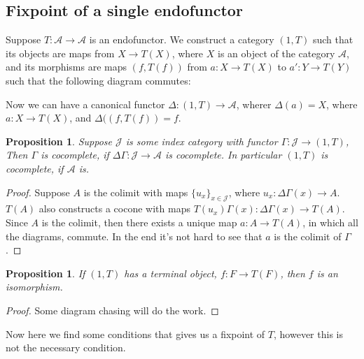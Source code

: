 \documentclass[12pt]{article}
\newcounter{the}
\newtheorem{proposition}[the]{Proposition}
\begin{document}
\newpage

\subsection*{Fixpoint of a single endofunctor}
Suppose $T: \mathscr A \to \mathscr A$ is an endofunctor. We construct a category $(1,  T)$ such that its objects are maps from $ X \to  T(  X)$, where $ X$ is an object of the category $\mathscr A$, and its morphisms are maps $(f,  T(f))$ from $a: X \to  T( X)$ to $a':  Y \to  T ( Y)$ such that the following diagram commutes:
\begin{center}
\end{center}
Now we can have a canonical functor $\Delta : (1,  T) \to \mathscr A$, wherer $\Delta(a) = X$, where $a:  X \to  T( X)$, and $\Delta ((f,  T(f)) = f$. 

\begin{proposition}
    Suppose $\mathscr J$ is some index category with functor $\Gamma: \mathscr J \to (1,  T)$, Then $\Gamma$ is cocomplete, if $\Delta \Gamma: \mathscr J \to \mathscr A$ is cocomplete. In particular $(1,  T)$ is cocomplete, if $\mathscr A$ is. 
\end{proposition}
\begin{proof}
    Suppose $A$ is the colimit with maps $\{u_x\}_{x \in \mathscr J}$, where $u_x: \Delta \Gamma (x) \to A$. $ T(A)$ also constructs a cocone with maps $T(u_x) \Gamma (x): \Delta \Gamma (x) \to  T(A)$. Since $A$ is the colimit, then there exists a unique map $a: A \to  T(A)$, in which all the diagrams, commute. In the end it's not hard to see that $a$ is the colimit of $\Gamma$.
\end{proof}

\begin{proposition}
    If $(1,  T)$ has a terminal object, $f: F \to  T(F)$, then $f$ is an isomorphism.
\end{proposition}
\begin{proof}
    Some diagram chasing will do the work. 
\end{proof}

Now here we find some conditions that gives us a fixpoint of $ T$, however this is not the necessary condition.
\end{document}
